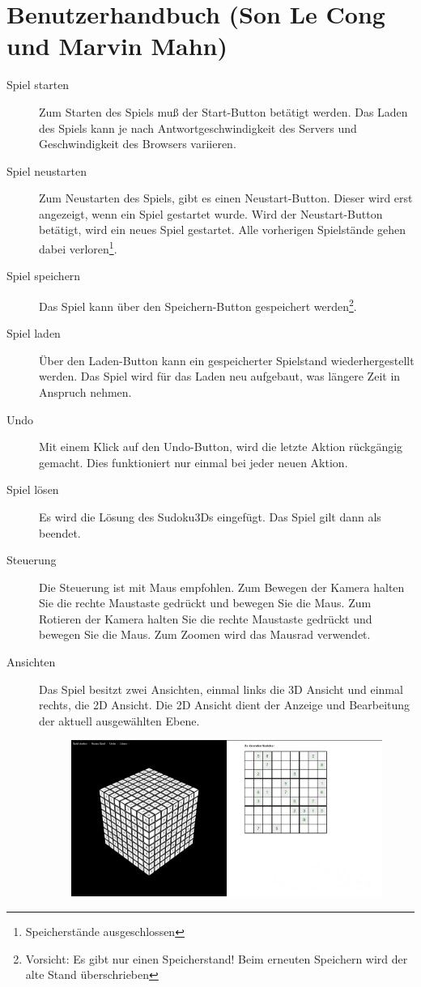 \documentclass[a4paper,12pt]{scrreprt}
\begin{document}
	\section{Benutzerhandbuch (Son Le Cong und Marvin Mahn)}
	\begin{description}
		\item[Spiel starten] Zum Starten des Spiels mu{\ss} der Start-Button bet\"atigt werden. Das Laden
			des Spiels kann je nach Antwortgeschwindigkeit des Servers und Geschwindigkeit des Browsers
			variieren.
		\item[Spiel neustarten] Zum Neustarten des Spiels, gibt es einen Neustart-Button. Dieser wird
			erst angezeigt, wenn ein Spiel gestartet wurde. Wird der Neustart-Button bet\"atigt, wird ein
			neues Spiel gestartet. Alle vorherigen Spielst\"ande gehen dabei verloren\footnote{Speicherst\"ande
			ausgeschlossen}.
		\item[Spiel speichern] Das Spiel kann \"uber den Speichern-Button gespeichert werden\footnote{
				Vorsicht: Es gibt nur einen Speicherstand! Beim erneuten Speichern wird der alte Stand
				\"uberschrieben}.
		\item[Spiel laden] \"Uber den Laden-Button kann ein gespeicherter Spielstand wiederhergestellt
			werden. Das Spiel wird f\"ur das Laden neu aufgebaut, was l\"angere Zeit in Anspruch nehmen.
		\item[Undo] Mit einem Klick auf den Undo-Button, wird die letzte Aktion r\"uckg\"angig gemacht.
			Dies funktioniert nur einmal bei jeder neuen Aktion.
		\item[Spiel l\"osen] Es wird die L\"osung des Sudoku3Ds eingef\"ugt. Das Spiel gilt dann als beendet.
		\item[Steuerung] Die Steuerung ist mit Maus empfohlen. Zum Bewegen der Kamera halten Sie die rechte Maustaste
			gedr\"uckt und bewegen Sie die Maus. Zum Rotieren der Kamera halten Sie die rechte Maustaste gedr\"uckt
			und bewegen Sie die Maus. Zum Zoomen wird das Mausrad verwendet.
		\item[Ansichten] Das Spiel besitzt zwei Ansichten, einmal links die 3D Ansicht und einmal rechts,
			die 2D Ansicht. Die 2D Ansicht dient der Anzeige und Bearbeitung der aktuell ausgew\"ahlten Ebene.\\
			\begin{figure}[h]
				\includegraphics[scale=0.3]{pictures/cover}

\end{figure}
\end{description}
\end{document}
